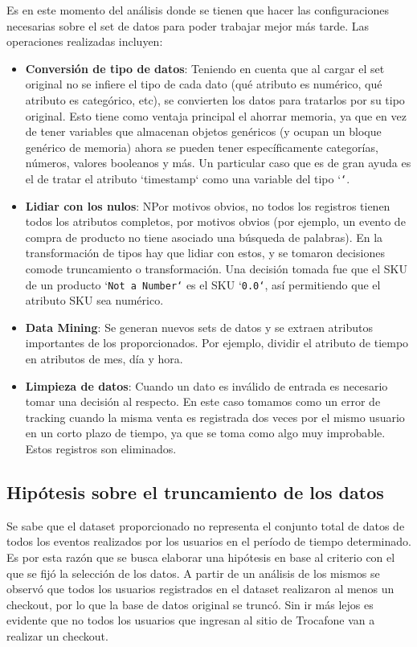 \documentclass[a4paper]{article}
\begin{document}
Es en este momento del análisis donde se tienen que hacer las configuraciones necesarias sobre el set de datos para poder trabajar mejor más tarde. Las operaciones realizadas incluyen:

\begin{itemize}
\item \textbf{Conversión de tipo de datos}: Teniendo en cuenta que al cargar el set original no se infiere el tipo de cada dato (qué atributo es numérico, qué atributo es categórico, etc), se convierten los datos para tratarlos por su tipo original. Esto tiene como ventaja principal el ahorrar memoria, ya que en vez de tener variables que almacenan objetos genéricos (y ocupan un bloque genérico de memoria) ahora se pueden tener específicamente categorías, números, valores booleanos y más. Un particular caso que es de gran ayuda es el de tratar el atributo `timestamp` como una variable del tipo `\texttt{`}.       \item \textbf{Lidiar con los nulos}: NPor motivos obvios, no todos los registros tienen todos los atributos completos, por motivos obvios (por ejemplo, un evento de compra de producto no tiene asociado una búsqueda de palabras). En la transformación de tipos hay que lidiar con estos, y se tomaron decisiones comode truncamiento o transformación. Una decisión tomada fue que el SKU de un producto `\texttt{Not a Number`} es el SKU `\texttt{0.0`}, así permitiendo que el atributo SKU sea numérico.
\item \textbf{Data Mining}: Se generan nuevos sets de datos y se extraen atributos importantes de los proporcionados. Por ejemplo, dividir el atributo de tiempo en atributos de mes, día y hora.
\item \textbf{Limpieza de datos}: Cuando un dato es inválido de entrada es necesario tomar una decisión al respecto. En este caso tomamos como un error de tracking cuando la misma venta es registrada dos veces por el mismo usuario en un corto plazo de tiempo, ya que se toma como algo muy improbable. Estos registros son eliminados.
\end{itemize}

\subsection{Hipótesis sobre el truncamiento de los datos}

Se sabe que el dataset proporcionado no representa el conjunto total de datos de todos los eventos realizados por los usuarios en el período de tiempo determinado. Es por esta razón que se busca elaborar una hipótesis en base al criterio con el que se fijó la selección de los datos. A partir de un análisis de los mismos se observó que todos los usuarios registrados en el dataset realizaron al menos un checkout, por lo que la base de datos original se truncó. Sin ir más lejos es evidente que no todos los usuarios que ingresan al sitio de Trocafone van a realizar un checkout.
\end{document}
